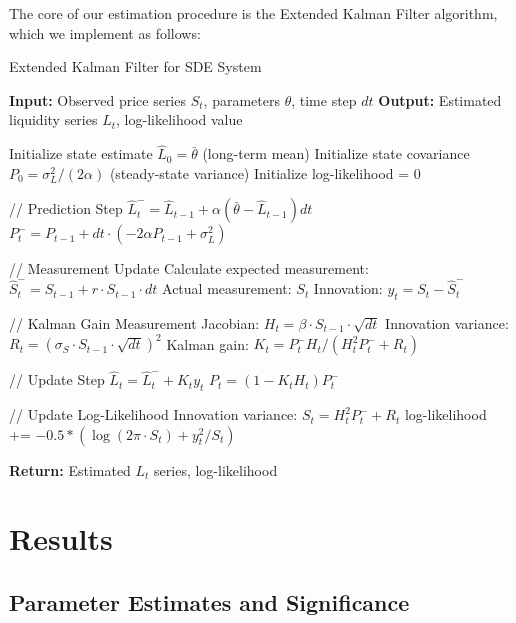 \documentclass[12pt,a4paper]{article}
\begin{document}
The core of our estimation procedure is the Extended Kalman Filter algorithm, which we implement as follows:

\begin{algorithm}
\caption{Extended Kalman Filter for SDE System}
\begin{algorithmic}[1]
\State \textbf{Input:} Observed price series $S_t$, parameters $\theta$, time step $dt$
\State \textbf{Output:} Estimated liquidity series $L_t$, log-likelihood value

\State Initialize state estimate $\hat{L}_0 = \bar{\theta}$ (long-term mean)
\State Initialize state covariance $P_0 = \sigma_L^2 / (2\alpha)$ (steady-state variance)
\State Initialize log-likelihood = 0

    \State // Prediction Step
    \State $\hat{L}_t^- = \hat{L}_{t-1} + \alpha(\bar{\theta} - \hat{L}_{t-1})dt$
    \State $P_t^- = P_{t-1} + dt \cdot (-2\alpha P_{t-1} + \sigma_L^2)$
    
    \State // Measurement Update
    \State Calculate expected measurement: $\hat{S}_t^- = S_{t-1} + r \cdot S_{t-1} \cdot dt$
    \State Actual measurement: $S_t$
    \State Innovation: $y_t = S_t - \hat{S}_t^-$
    
    \State // Kalman Gain
    \State Measurement Jacobian: $H_t = \beta \cdot S_{t-1} \cdot \sqrt{dt}$
    \State Innovation variance: $R_t = (\sigma_S \cdot S_{t-1} \cdot \sqrt{dt})^2$
    \State Kalman gain: $K_t = P_t^- H_t / (H_t^2 P_t^- + R_t)$
    
    \State // Update Step
    \State $\hat{L}_t = \hat{L}_t^- + K_t y_t$
    \State $P_t = (1 - K_t H_t) P_t^-$
    
    \State // Update Log-Likelihood
    \State Innovation variance: $S_t = H_t^2 P_t^- + R_t$
    \State log-likelihood += $-0.5 * (\log(2\pi \cdot S_t) + y_t^2 / S_t)$
\EndFor

\State \textbf{Return:} Estimated $L_t$ series, log-likelihood
\end{algorithmic}
\end{algorithm}

\section{Results}

\subsection{Parameter Estimates and Significance}
\end{document}
